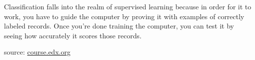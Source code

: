 \documentclass{article}
\begin{document}
\par Classification falls into the realm of supervised learning because in order for it to work, you have to guide the computer by proving it with examples of correctly labeled records. Once you're done training the computer, you can test it by seeing how accurately it scores those records.

\begin{flushright}
    source: \href{https://courses.edx.org/courses/course-v1:Microsoft+DAT210x+6T2016/courseware/e36e6b45ae5d4032bef2ec557c1ff48f/a8cf8333f6044e9b9a357b7797f282e3/?child=first}{course.edx.org}  
\end{flushright}
\end{document}
